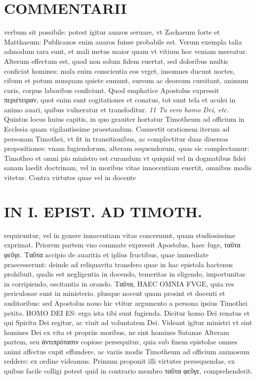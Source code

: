 \documentclass{article}
\begin{document}
\begin{pages}
\section*{COMMENTARII }
\marginpar{[ p.158 ]}\pstart verbum sit possibile: potest igitur auaros seruare, vt Zachaeum forte et Matthaeum: Publicanos enim auaros fuisse probabile est. Verum exempla talia admodum rara sunt, et mali metus maior quam vt vitium hoc veniam mereatur.  \pend\pstart Alterum effectum est, quod non solum fidem euertat, sed doloribus multis conficiat homines: mala enim conscientia eos vrget, insomnes ducunt noctes, cibum et potum nunquam quiete sumunt, sursum ac deorsum cursitant, animum curis, corpus laboribus conficiunt. Quod emphatice Apostolus expressit περιέτειραν, quot enim sunt cogitationes et conatus, tot sunt tela et aculei in animo auari, quibus vulneratur et transfoditur.  \pend
\textit{11 Tu vero homo Dei, etc. }\pstart Quintus locus huius capitis, in quo grauiter hortatur Timotheum ad officium in Ecclesia quam vigilantissime praestandum. Conuertit orationem iterum ad personam Timothei, vt fit in transitionibus, ac complectitur duas diuersas propositiones: vnam fugiendorum, alteram sequendorum, quas sic complectamur: Timotheo et omni pio ministro est curandum vt quiquid vel in dogmatibus fidei sanam laedit doctrinam, vel in moribus vitae innocentiam euertit, omnibus modis vitetur. Contra virtutes quae vel in docente  \pend
\section*{IN I. EPIST. AD TIMOTH. }
\marginpar{[ p.159 ]}\pstart requiruntur, vel in genere innocentiam vitae concernunt, quam studiosissime exprimat. Priorem partem vno commate expressit Apostolus, haec fuge, ταῦτα φεῦγε. Ταῦτα accipio de auaritia et iplius fructibus, quae immediate praecesserunt: deinde ad reliquavita transfero quae in hac epistola hactenus prohibuit, qualis est negligentia in docendo, temeritas in eligendo, importunitas in corripiendo, oscitantia in orando. Ταῦτα, HAEC OMNIA FVGE, quia res periculosae sunt in ministerio. plusque nocent quam prosint et docenti et auditoribus: sed Apostolus nouo hic vtitur argumento a persona ipsius Timothei petito. HOMO DEI ES: ergo ista tibi sunt fugienda. Dicitur homo Dei renatus et qui Spiritu Dei regitur, ac viuit ad voluntatem Dei.  \pend\pstart Videant igitur ministri vt sint homines Dei ex vita et propriis moribus, ne sint homines Satanae  \pend\pstart Alteram partem, seu ἀντιπρότασιν copiose persequitur, quia sub finem epistolae omnes animi affectus cupit effundere, ac variis modis Timotheum ad officium animosum reddere: ex ordine videamus.  \pend\pstart Primum proponit illi virtutes persequendas, ex quibus facile colligi potest quid in contrario membro ταῦτα φεῦγε, comprehenderit.  \pend

\end{pages}
\end{document}
